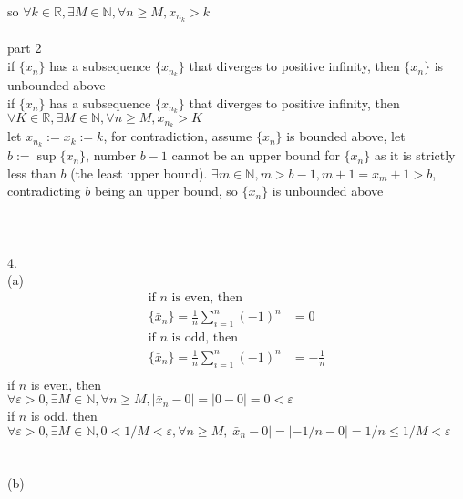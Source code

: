 \documentclass[12pt, border = 4pt, multi]{article} %
\begin{document}
so $\forall k \in \mathbb{R}, \exists M \in \mathbb{N}, \forall n \geq M, x_{n_k} > k$\\
\\
part 2\\
if $\{x_n\}$ has a subsequence $\{x_{n_k}\}$ that diverges to positive infinity, then $\{x_n\}$ is unbounded above\\
if $\{x_n\}$ has a subsequence $\{x_{n_k}\}$ that diverges to positive infinity, then\\ $\forall K \in \mathbb{R}, \exists M \in \mathbb{N}, \forall n \geq M, x_{n_k} > K$\\
let $x_{n_k} := x_k := k$, for contradiction, assume $\{x_n\}$ is bounded above, let $b := \sup\{x_n\}$, number $b - 1$ cannot be an upper bound for $\{x_n\}$ as it is strictly less than $b$ (the least upper bound). $\exists m \in \mathbb{N}, m > b - 1, m + 1 = x_m + 1 > b$, contradicting $b$ being an upper bound, so $\{x_n\}$ is unbounded above\\
\\
\\
\\
4.\\
(a)
\begin{align*}
\text{if } n \text{ is even, then }\\
\{\bar{x}_n\} = \frac{1}{n}\sum_{i = 1} ^ n (-1) ^ n &= 0\\
\text{if } n \text{ is odd, then }\\
\{\bar{x}_n\} = \frac{1}{n}\sum_{i = 1} ^ n (-1) ^ n &= -\frac{1}{n}\\ 
\end{align*}
if $n$ is even, then\\
$\forall \varepsilon > 0, \exists M \in \mathbb{N}, \forall n \geq M, |\bar{x}_n - 0| = |0 - 0| = 0 < \varepsilon$\\
if $n$ is odd, then\\
$\forall \varepsilon > 0, \exists M \in \mathbb{N}, 0 < 1 / M < \varepsilon, \forall n \geq M, |\bar{x}_n - 0| = |-1 / n - 0| = 1 / n \leq 1 / M < \varepsilon$\\
\\
\\
(b)
\end{document}
